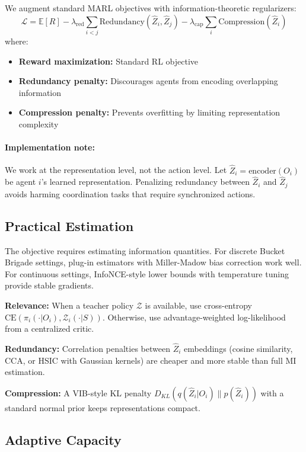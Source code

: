\documentclass[10pt, letterpaper]{article}
\begin{document}
We augment standard MARL objectives with information-theoretic regularizers:
\[\mathcal{L} = \mathbb{E}[R] - \lambda_{\text{red}} \sum_{i < j} \text{Redundancy}(\hat{Z}_i, \hat{Z}_j) - \lambda_{\text{cap}} \sum_i \text{Compression}(\hat{Z}_i)\]
where:
\begin{itemize}
    \item \textbf{Reward maximization:} Standard RL objective
    \item \textbf{Redundancy penalty:} Discourages agents from encoding overlapping information
    \item \textbf{Compression penalty:} Prevents overfitting by limiting representation complexity
\end{itemize}

\paragraph{Implementation note:} We work at the representation level, not the action level. Let $\hat{Z}_i = \text{encoder}(O_i)$ be agent $i$'s learned representation. Penalizing redundancy between $\hat{Z}_i$ and $\hat{Z}_j$ avoids harming coordination tasks that require synchronized actions.

\subsection{Practical Estimation}

The objective requires estimating information quantities. For discrete Bucket Brigade settings, plug-in estimators with Miller-Madow bias correction work well. For continuous settings, InfoNCE-style lower bounds with temperature tuning provide stable gradients.

\textbf{Relevance:} When a teacher policy $\mathcal{Z}$ is available, use cross-entropy $\text{CE}(\pi_i(\cdot|O_i), \mathcal{Z}_i(\cdot|S))$. Otherwise, use advantage-weighted log-likelihood from a centralized critic.

\textbf{Redundancy:} Correlation penalties between $\hat{Z}_i$ embeddings (cosine similarity, CCA, or HSIC with Gaussian kernels) are cheaper and more stable than full MI estimation.

\textbf{Compression:} A VIB-style KL penalty $D_{KL}(q(\hat{Z}_i|O_i) \| p(\hat{Z}_i))$ with a standard normal prior keeps representations compact.

\subsection{Adaptive Capacity}
\end{document}
